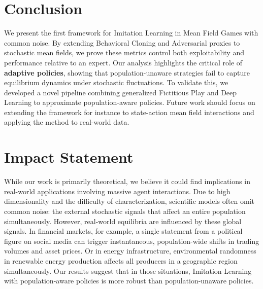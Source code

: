 \documentclass{article}
\newcommand{\defi}[1]{{\bf #1}}
\theoremstyle{plain}
\begin{document}
\section{Conclusion}
\label{sec:ccl}

We present the first framework for Imitation Learning in Mean Field Games with common noise. By extending Behavioral Cloning and Adversarial proxies to stochastic mean fields, we prove these metrics control both exploitability and performance relative to an expert. Our analysis highlights the critical role of \defi{adaptive policies}, showing that population-unaware strategies fail to capture equilibrium dynamics under stochastic fluctuations. To validate this, we developed a novel pipeline combining generalized Fictitious Play and Deep Learning to approximate population-aware policies. Future work should focus on extending the framework for instance to state-action mean field interactions and applying the method to real-world data.



\section*{Impact Statement}
While our work is primarily theoretical, we believe it could find implications in real-world applications involving massive agent interactions. Due to high dimensionality and the difficulty of characterization, scientific models often omit common noise: the external stochastic signals that affect an entire population simultaneously. However, real-world equilibria are influenced by these global signals. In financial markets, for example, a single statement from a political figure on social media can trigger instantaneous, population-wide shifts in trading volumes and asset prices. Or in energy infrastructure, environmental randomness in renewable energy production affects all producers in a geographic region simultaneously. Our results suggest that in those situations, Imitation Learning with population-aware policies is more robust than population-unaware policies.


\end{document}
